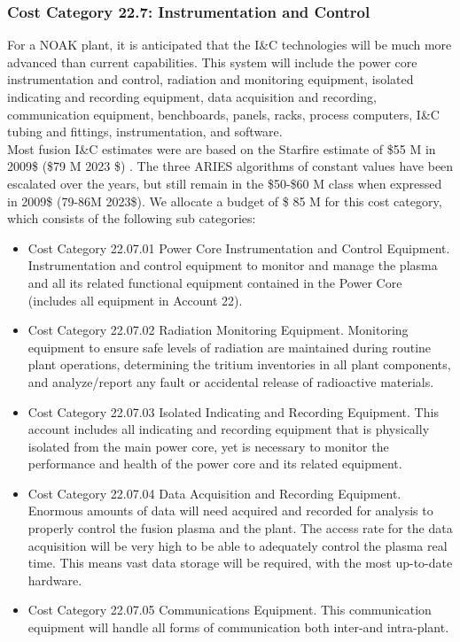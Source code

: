 \subsubsection{Cost Category 22.7: Instrumentation and Control }

For a NOAK plant, it is anticipated that the I\&C technologies will be much more advanced than current  capabilities. This system will include the power core instrumentation and control, radiation and  monitoring equipment, isolated indicating and recording equipment, data acquisition and  recording, communication equipment, benchboards, panels, racks, process computers, I\&C tubing and fittings, instrumentation, and software.\\

Most fusion I\&C estimates were are based on the Starfire  estimate of \$55 M in 2009\$ (\$79 M 2023 \$) . The three ARIES algorithms of constant values have been  escalated over the years, but still remain in the \$50-\$60 M class when expressed in 2009\$ (79-86M 2023\$).  We allocate a budget of \$ 85 M for this cost category, which consists of the following sub categories:

\begin{itemize}
\item Cost Category 22.07.01 Power Core Instrumentation and Control Equipment. Instrumentation and control equipment to monitor and manage the plasma and all  its related functional equipment contained in the Power Core (includes all equipment in Account 22).

\item Cost Category 22.07.02 Radiation Monitoring Equipment. Monitoring equipment to ensure safe levels of radiation are maintained  during routine plant operations, determining the tritium inventories in all plant components, and  analyze/report any fault or accidental release of radioactive materials. 

\item Cost Category 22.07.03 Isolated Indicating and Recording Equipment. This account includes all  indicating and recording equipment that is physically isolated from the main power core, yet is  necessary to monitor the performance and health of the power core and its related equipment. 

\item Cost Category 22.07.04 Data Acquisition and Recording Equipment. Enormous amounts of data will need acquired and recorded  for analysis to properly control the fusion plasma and the plant. The access rate for the data  acquisition will be very high to be able to adequately control the plasma real time. This means vast data storage will be required, with the most up-to-date hardware.

\item Cost Category 22.07.05 Communications Equipment. This communication equipment will handle  all forms of communication both inter-and intra-plant. 

\end{itemize}
